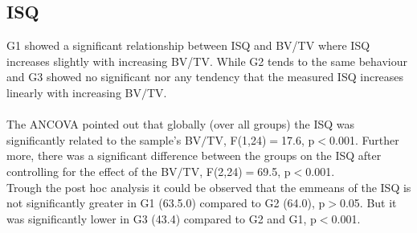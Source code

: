\documentclass[12pt, a4paper, twoside]{report}
\begin{document}
\subsection{ISQ}
%
\begin{figure}[H]
\centering 
{}
\label{fig:ISQ_exp}
\end{figure}
%
\begin{table}[H]
\centering
{}
\caption{Results for the linear regression (RSE: residual standard error, CV: coefficient of variation) of the experimentally evaluated ISQ values. And the evaluation of the ANCOVA by the emmenas after Bonferroni correction.}
\label{tab:LGisq}
\end{table}
%
G1 showed a significant relationship between ISQ and BV/TV where ISQ increases slightly with increasing BV/TV. While G2 tends to the same behaviour and G3 showed no significant nor any tendency that the measured ISQ increases linearly with increasing BV$/$TV.\\
\\
%
The ANCOVA pointed out that globally (over all groups) the ISQ was significantly related to the sample's BV$/$TV, F(1,24)$=$17.6, p$<$0.001. Further more, there was a significant difference between the groups on the ISQ after controlling for the effect of the BV$/$TV, F(2,24)$=$69.5, p$<$0.001.\\
Trough the post hoc analysis it could be observed that the emmeans of the ISQ is not significantly greater in G1 (63.5.0) compared to G2 (64.0), p$>$0.05. But it was significantly lower in G3 (43.4) compared to G2 and G1, p$<$0.001.
%
%
%
\end{document}
